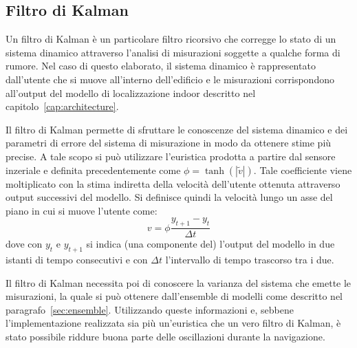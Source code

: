 \subsection{Filtro di Kalman}\label{sec:kalman}
Un filtro di Kalman è un particolare filtro ricorsivo che corregge lo stato di
un sistema dinamico attraverso l'analisi di misurazioni soggette a qualche
forma di rumore. Nel caso di questo elaborato, il sistema dinamico è
rappresentato dall'utente che si muove all'interno dell'edificio e le
misurazioni corrispondono all'output del modello di localizzazione indoor
descritto nel capitolo~\ref{cap:architecture}.

Il filtro di Kalman permette di sfruttare le conoscenze del sistema dinamico e
dei parametri di errore del sistema di misurazione in modo da ottenere stime
più precise. A tale scopo si può utilizzare l'euristica prodotta a partire dal
sensore inzeriale e definita precedentemente come \(\phi = \tanh(|\tilde{v}|)\).
Tale coefficiente viene moltiplicato con la stima indiretta della velocità
dell'utente ottenuta attraverso output successivi del modello. Si definisce
quindi la velocità lungo un asse del piano in cui si muove l'utente come:
\[ v = \phi \frac{y_{t+1} - y_t}{\Delta t} \]
dove con \(y_t\) e \(y_{t+1}\) si indica (una componente del) l'output del
modello in due istanti di tempo consecutivi e con \(\Delta t\) l'intervallo di
tempo trascorso tra i due.

Il filtro di Kalman necessita poi di conoscere la varianza del sistema che
emette le misurazioni, la quale si può ottenere dall'ensemble di modelli come
descritto nel paragrafo~\ref{sec:ensemble}. Utilizzando queste informazioni e,
sebbene l'implementazione realizzata sia più un'euristica che un vero filtro di
Kalman, è stato possibile riddure buona parte delle oscillazioni durante la
navigazione.




